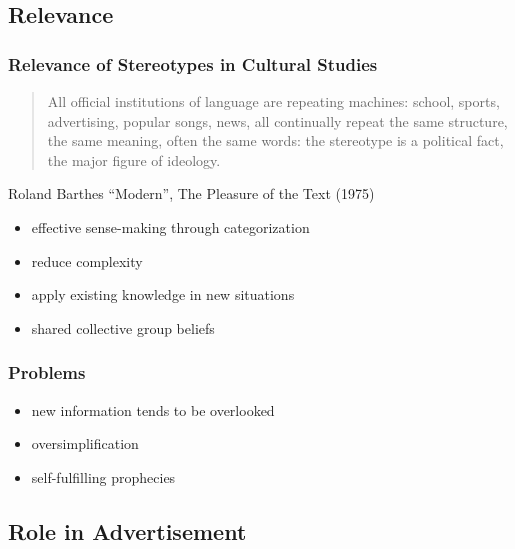 \documentclass{beamer}
\begin{document}
\subsection{Relevance}

\begin{frame}
 \frametitle{Relevance of Stereotypes in Cultural Studies}
 \begin{quotation} 
   All official institutions of language are repeating machines: school, sports, advertising, popular songs, news, all continually repeat the same structure, the same meaning, often the same words: the stereotype is a political fact, the major figure of ideology.\\
 \end{quotation}
 Roland Barthes ``Modern'', The Pleasure of the Text (1975)
\end{frame}

\begin{frame}
 \begin{itemize}
 \frametitle{Benefits}
  \item effective sense-making through categorization
  \item reduce complexity
  \item apply existing knowledge in new situations
  \item shared collective group beliefs
 \end{itemize}
\end{frame}

\begin{frame}
 \frametitle{Problems}
 \begin{itemize}
  \item new information tends to be overlooked
  \item oversimplification
  \item self-fulfilling prophecies
 \end{itemize}
\end{frame}

\subsection{Role in Advertisement}
\end{document}
